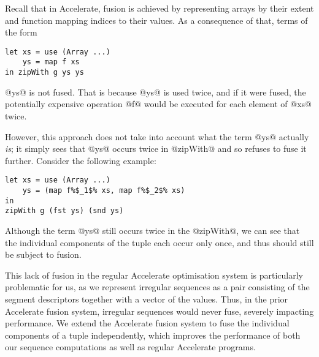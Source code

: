 

Recall that in Accelerate, fusion is achieved by representing arrays by their extent and function mapping indices to their values. As a consequence of that, terms of the form
%
\begin{lstlisting}
let xs = use (Array ...)
    ys = map f xs
in zipWith g ys ys
\end{lstlisting}
%
@ys@ is not fused. That is because @ys@ is used twice, and if it were fused, the potentially expensive operation @f@ would be executed for each element of @xs@ twice.


However, this approach does not take into account what the term @ys@ actually
\emph{is}; it simply sees that @ys@ occurs twice in @zipWith@ and so refuses to fuse it further. Consider the following example:
%
\begin{lstlisting}
let xs = use (Array ...)
    ys = (map f%$_1$% xs, map f%$_2$% xs)
in
zipWith g (fst ys) (snd ys)
\end{lstlisting}
%
Although the term @ys@ still occurs twice in the @zipWith@, we can see that the
individual components of the tuple each occur only once, and thus should still
be subject to fusion.

This lack of fusion in the regular Accelerate optimisation system is particularly problematic for us, as we represent irregular sequences as a pair consisting of the segment descriptors together with a vector of the values. Thus, in the prior Accelerate fusion system, irregular sequences would never fuse, severely impacting performance. We extend the Accelerate fusion system to fuse the individual components of a tuple independently, which improves the performance of both our sequence computations as well as regular Accelerate programs.

